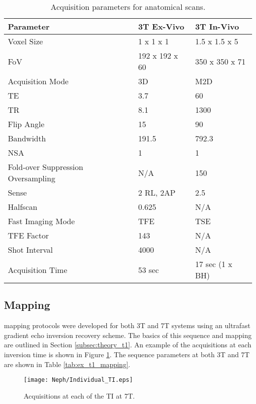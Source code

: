 \begin{table}[H]
	\centering
	\begin{tabularx}{1.0\textwidth}{|X|X|X|}
		\hline
		Parameter                          & 3T Ex-Vivo     & 3T In-Vivo      \\ \hline
		Voxel Size                         & 1 x 1 x 1      & 1.5 x 1.5 x 5   \\ \hline
		FoV                                & 192 x 192 x 60 & 350 x 350 x 71  \\ \hline
		Acquisition Mode                   & 3D             & M2D             \\ \hline
		TE                                 & 3.7            & 60              \\ \hline
		TR                                 & 8.1            & 1300            \\ \hline
		Flip Angle                         & 15             & 90              \\ \hline
		Bandwidth                          & 191.5          & 792.3           \\ \hline
		NSA                                & 1              & 1               \\ \hline
		Fold-over Suppression Oversampling & N/A            & 150             \\ \hline
		Sense                              & 2 RL, 2AP      & 2.5             \\ \hline
		Halfscan                           & 0.625          & N/A             \\ \hline
		Fast Imaging Mode                  & TFE            & TSE             \\ \hline
		TFE Factor                         & 143            & N/A             \\ \hline
		Shot Interval                      & 4000           & N/A             \\ \hline
		Acquisition Time                   & 53 sec         & 17 sec (1 x BH) \\ \hline
	\end{tabularx}
	\caption{Acquisition parameters for anatomical scans.}
	\label{tab:ex_anatomical}
\end{table}

\subsection{\tone Mapping}
\tone mapping protocols were developed for both 3T and 7T systems using an ultrafast gradient echo inversion recovery scheme. The basics of this sequence and \tone mapping are outlined in Section \ref{subsec:theory_t1}. An example of the acquisitions at each inversion time is shown in Figure \ref{fig:ex_ir_data}. The sequence parameters at both 3T and 7T are shown in Table \ref{tab:ex_t1_mapping}.
\begin{figure}[H]
	\centering
	\texttt{[image: Neph/Individual\_TI.eps]}
	\caption{Acquisitions at each of the \ac{TI} at 7T.}
	\label{fig:ex_ir_data}	
\end{figure}

